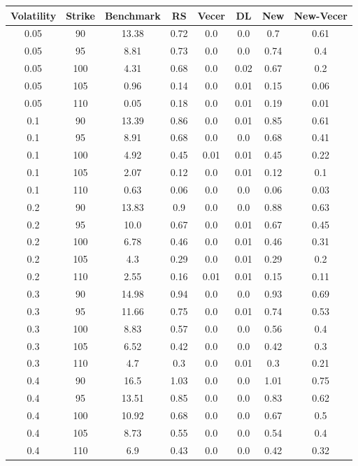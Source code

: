 \documentclass{article}
\begin{document}
\begin{table}[H]
  \begin{tabular}{|c|c|c|c|c|c|c|c|}
  \hline
  Volatility & Strike & Benchmark & RS & Vecer & DL & New & New-Vecer \\
  \hline
  0.05 & 90 & 13.38 & 0.72 & 0.0 & 0.0 & 0.7 & 0.61 \\
  0.05 & 95 & 8.81 & 0.73 & 0.0 & 0.0 & 0.74 & 0.4 \\
  0.05 & 100 & 4.31 & 0.68 & 0.0 & 0.02 & 0.67 & 0.2 \\
  0.05 & 105 & 0.96 & 0.14 & 0.0 & 0.01 & 0.15 & 0.06 \\
  0.05 & 110 & 0.05 & 0.18 & 0.0 & 0.01 & 0.19 & 0.01 \\
  0.1 & 90 & 13.39 & 0.86 & 0.0 & 0.01 & 0.85 & 0.61 \\
  0.1 & 95 & 8.91 & 0.68 & 0.0 & 0.0 & 0.68 & 0.41 \\
  0.1 & 100 & 4.92 & 0.45 & 0.01 & 0.01 & 0.45 & 0.22 \\
  0.1 & 105 & 2.07 & 0.12 & 0.0 & 0.01 & 0.12 & 0.1 \\
  0.1 & 110 & 0.63 & 0.06 & 0.0 & 0.0 & 0.06 & 0.03 \\
  0.2 & 90 & 13.83 & 0.9 & 0.0 & 0.0 & 0.88 & 0.63 \\
  0.2 & 95 & 10.0 & 0.67 & 0.0 & 0.01 & 0.67 & 0.45 \\
  0.2 & 100 & 6.78 & 0.46 & 0.0 & 0.01 & 0.46 & 0.31 \\
  0.2 & 105 & 4.3 & 0.29 & 0.0 & 0.01 & 0.29 & 0.2 \\
  0.2 & 110 & 2.55 & 0.16 & 0.01 & 0.01 & 0.15 & 0.11 \\
  0.3 & 90 & 14.98 & 0.94 & 0.0 & 0.0 & 0.93 & 0.69 \\
  0.3 & 95 & 11.66 & 0.75 & 0.0 & 0.01 & 0.74 & 0.53 \\
  0.3 & 100 & 8.83 & 0.57 & 0.0 & 0.0 & 0.56 & 0.4 \\
  0.3 & 105 & 6.52 & 0.42 & 0.0 & 0.0 & 0.42 & 0.3 \\
  0.3 & 110 & 4.7 & 0.3 & 0.0 & 0.01 & 0.3 & 0.21 \\
  0.4 & 90 & 16.5 & 1.03 & 0.0 & 0.0 & 1.01 & 0.75 \\
  0.4 & 95 & 13.51 & 0.85 & 0.0 & 0.0 & 0.83 & 0.62 \\
  0.4 & 100 & 10.92 & 0.68 & 0.0 & 0.0 & 0.67 & 0.5 \\
  0.4 & 105 & 8.73 & 0.55 & 0.0 & 0.0 & 0.54 & 0.4 \\
  0.4 & 110 & 6.9 & 0.43 & 0.0 & 0.0 & 0.42 & 0.32 \\

\end{tabular}
\end{table}
\end{document}
